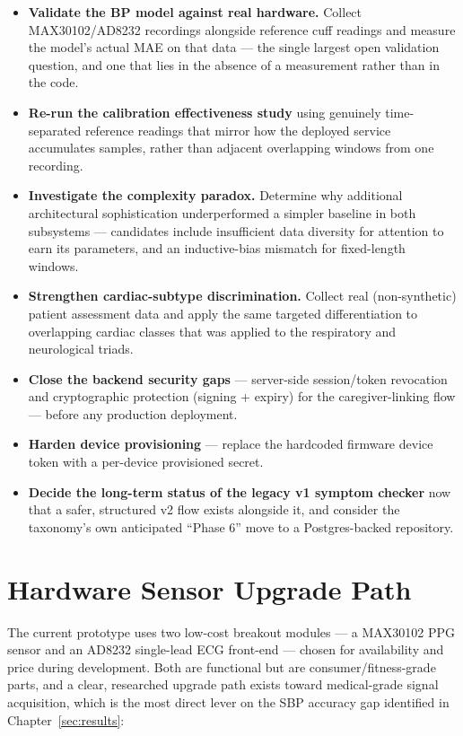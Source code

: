 \documentclass[12pt,a4paper]{report}
\begin{document}
\begin{itemize}[leftmargin=1.4em]
  \item \textbf{Validate the BP model against real hardware.} Collect
  MAX30102/AD8232 recordings alongside reference cuff readings and measure the
  model's actual MAE on that data --- the single largest open validation
  question, and one that lies in the absence of a measurement rather than in the
  code.
  \item \textbf{Re-run the calibration effectiveness study} using genuinely
  time-separated reference readings that mirror how the deployed service
  accumulates samples, rather than adjacent overlapping windows from one
  recording.
  \item \textbf{Investigate the complexity paradox.} Determine why additional
  architectural sophistication underperformed a simpler baseline in both
  subsystems --- candidates include insufficient data diversity for attention to
  earn its parameters, and an inductive-bias mismatch for fixed-length windows.
  \item \textbf{Strengthen cardiac-subtype discrimination.} Collect real
  (non-synthetic) patient assessment data and apply the same targeted
  differentiation to overlapping cardiac classes that was applied to the
  respiratory and neurological triads.
  \item \textbf{Close the backend security gaps} --- server-side session/token
  revocation and cryptographic protection (signing + expiry) for the
  caregiver-linking flow --- before any production deployment.
  \item \textbf{Harden device provisioning} --- replace the hardcoded firmware
  device token with a per-device provisioned secret.
  \item \textbf{Decide the long-term status of the legacy v1 symptom checker}
  now that a safer, structured v2 flow exists alongside it, and consider the
  taxonomy's own anticipated ``Phase 6'' move to a Postgres-backed repository.
\end{itemize}

\section{Hardware Sensor Upgrade Path}

The current prototype uses two low-cost breakout modules --- a MAX30102 PPG
sensor and an AD8232 single-lead ECG front-end --- chosen for availability and
price during development. Both are functional but are consumer/fitness-grade
parts, and a clear, researched upgrade path exists toward medical-grade signal
acquisition, which is the most direct lever on the SBP accuracy gap identified
in Chapter~\ref{sec:results}:
\end{document}
